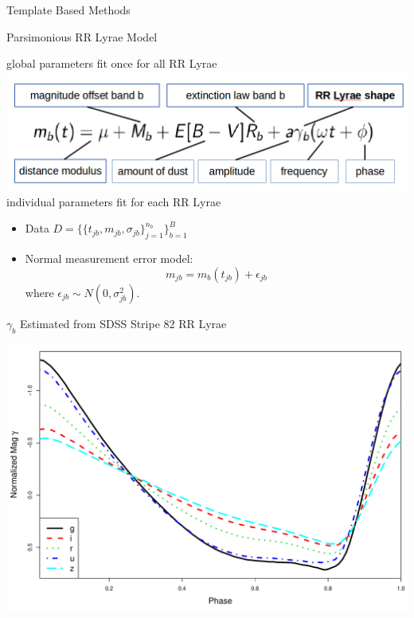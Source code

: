 \documentclass[12pt]{beamer}
\begin{document}
\begin{frame}{Template Based Methods}

\end{frame}


\begin{frame}{Parsimonious RR Lyrae Model}


\begin{center}
global parameters fit once for all RR Lyrae\\
\includegraphics[scale=.3]{figs/model.png}\\
individual parameters fit for each RR Lyrae
\end{center}

\vspace{.2in}

\begin{itemize}
\item Data $D=\{\{t_{jb},m_{jb},\sigma_{jb}\}_{j=1}^{n_b}\}_{b=1}^B$
\item Normal measurement error model:
\begin{equation*}
m_{jb} = m_b(t_{jb}) + \epsilon_{jb}
\end{equation*}
where $\epsilon_{jb} \sim N(0,\sigma_{jb}^2)$.
\end{itemize}
\end{frame}

\begin{frame}{$\gamma_b$ Estimated from SDSS Stripe 82 RR Lyrae}

\begin{center}
\includegraphics[scale=.3]{figs/templates.pdf}
\end{center}

\end{frame}
\end{document}
